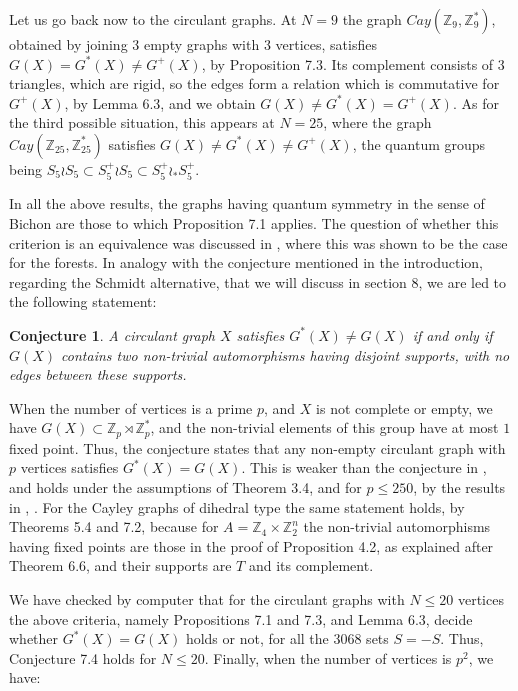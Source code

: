 \documentclass[11pt]{amsart}
\newtheorem{conjecture}[theorem]{Conjecture}
\newcommand{\Z}{\mathbb Z}
\begin{document}
Let us go back now to the circulant graphs. At $N=9$ the graph $Cay(\Z_9,\Z_9^*)$, obtained by joining $3$ empty graphs with $3$ vertices, satisfies $G(X)=G^*(X)\neq G^+(X)$, by Proposition 7.3. Its complement consists of $3$ triangles, which are rigid, so the edges form a relation which is commutative for $G^+(X)$, by Lemma 6.3, and we obtain $G(X)\neq G^*(X)=G^+(X)$. As for the third possible situation, this appears at $N=25$, where the graph $Cay(\Z_{25},\Z_{25}^*)$ satisfies $G(X)\neq G^*(X)\neq G^+(X)$, the quantum groups being $S_5\wr S_5\subset S_5^+\wr S_5\subset S_5^+\wr_*S_5^+$.

In all the above results, the graphs having quantum symmetry in the sense of Bichon are those to which Proposition 7.1 applies. The question of whether this criterion is an equivalence was discussed in \cite{hkm}, where this was shown to be the case for the forests. In analogy with the conjecture mentioned in the introduction, regarding the Schmidt alternative, that we will discuss in section 8, we are led to the following statement:

\begin{conjecture}
A circulant graph $X$ satisfies $G^*(X)\neq G(X)$ if and only if $G(X)$ contains two non-trivial automorphisms having disjoint supports, with no edges between these supports.
\end{conjecture}

When the number of vertices is a prime $p$, and $X$ is not complete or empty, we have $G(X)\subset\Z_p\rtimes\Z_p^*$, and the non-trivial elements of this group have at most $1$ fixed point. Thus, the conjecture states that any non-empty circulant graph with $p$ vertices satisfies $G^*(X)=G(X)$. This is weaker than the conjecture in \cite{mar}, and holds under the assumptions of Theorem 3.4, and for $p\leq250$, by the results in \cite{cha}, \cite{mar}. For the Cayley graphs of dihedral type the same statement holds, by Theorems 5.4 and 7.2, because for $A=\Z_4\times\Z_2^n$ the non-trivial automorphisms having fixed points are those in the proof of Proposition 4.2, as explained after Theorem 6.6, and their supports are $T$ and its complement.

We have checked by computer that for the circulant graphs with $N\leq20$ vertices the above criteria, namely Propositions 7.1 and 7.3, and Lemma 6.3, decide whether $G^*(X)=G(X)$ holds or not, for all the $3068$ sets $S=-S$. Thus, Conjecture 7.4 holds for $N\leq20$. Finally, when the number of vertices is $p^2$, we have:
\end{document}
